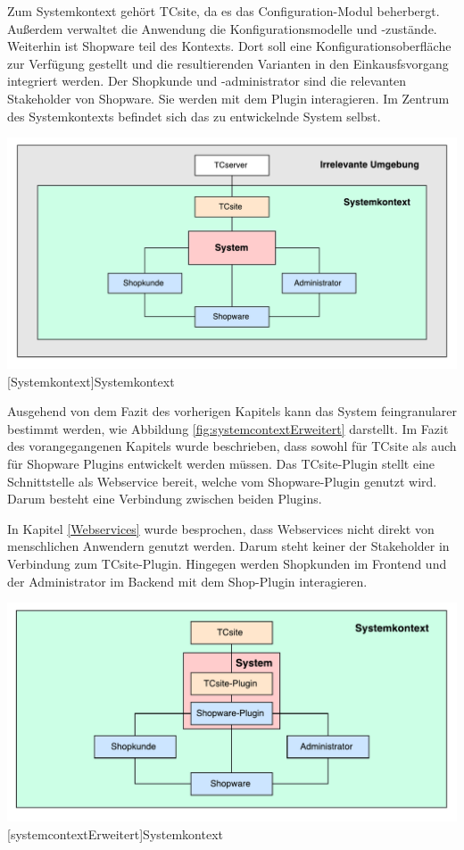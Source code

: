 \documentclass[11pt, a4paper, titlepage, listof=totoc, bibliography=totoc, index=totoc, twoside, openright, headings=normal, draft]{scrreprt}
\begin{document}
Zum Systemkontext gehört TCsite, da es das Configuration-Modul beherbergt. Außerdem verwaltet die Anwendung die Konfigurationsmodelle und -zustände. Weiterhin ist Shopware teil des Kontexts. Dort soll eine Konfigurationsoberfläche zur Verfügung gestellt und die resultierenden Varianten in den Einkausfsvorgang integriert werden. Der Shopkunde und -administrator sind die relevanten Stakeholder von Shopware. Sie werden mit dem Plugin interagieren.
Im Zentrum des Systemkontexts befindet sich das zu entwickelnde System selbst.

\vspace{1em}
\begin{minipage}{\linewidth}
	\centering
	\includegraphics[width=0.8\linewidth]{Abbildungen/systemcontext.pdf}
	[Systemkontext]{Systemkontext}
	\label{fig:systemcontext}
\end{minipage}
\vspace{0.3em}

Ausgehend von dem Fazit des vorherigen Kapitels kann das System feingranularer bestimmt werden, wie Abbildung \ref{fig:systemcontextErweitert} darstellt. Im Fazit des vorangegangenen Kapitels wurde beschrieben, dass sowohl für TCsite als auch für Shopware Plugins entwickelt werden müssen. Das TCsite-Plugin stellt eine Schnittstelle als Webservice bereit, welche vom Shopware-Plugin genutzt wird. Darum besteht eine Verbindung zwischen beiden Plugins.

In Kapitel \ref{Webservices} wurde besprochen, dass Webservices nicht direkt von menschlichen Anwendern genutzt werden. Darum steht keiner der Stakeholder in Verbindung zum TCsite-Plugin. Hingegen werden Shopkunden im Frontend und der Administrator im Backend mit dem Shop-Plugin interagieren.

\vspace{1em}
\begin{minipage}{\linewidth}
	\centering
	\includegraphics[width=0.8\linewidth]{Abbildungen/systemcontextErweitert.pdf}
	[systemcontextErweitert]{Systemkontext}
	\label{fig:systemcontextErweitert}
\end{minipage}
\vspace{1em}
\end{document}
